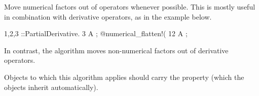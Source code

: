 
Move numerical factors out of operators whenever possible. This is
mostly useful in combination with derivative operators, as in the
example below.
\begin{screen}{1,2,3}
\partial{#}::PartialDerivative.
3 A ;
@numerical_flatten!(%
12 A ;
\end{screen}
In contrast, the  algorithm moves non-numerical
factors out of derivative operators.

Objects to which this algorithm applies should carry
the  property (which the 
objects inherit automatically).

